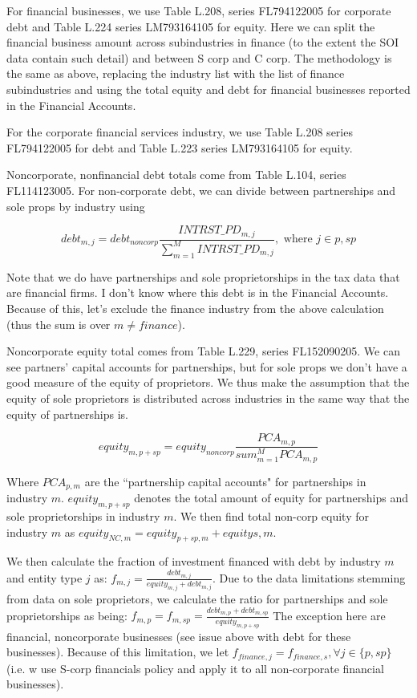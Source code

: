 \documentclass[article,11pt,letterpaper,fleqn]{article}
\theoremstyle{definition}
\numberwithin{equation}{section}
\begin{document}
For financial businesses, we use Table L.208, series FL794122005 for corporate debt and Table L.224 series LM793164105 for equity.  Here we can split the financial business amount across subindustries in finance (to the extent the SOI data contain such detail) and between S corp and C corp.  The methodology is the same as above, replacing the industry list with the list of finance subindustries and using the total equity and debt for financial businesses reported in the Financial Accounts.

For the corporate financial services industry, we use Table L.208 series FL794122005 for debt and Table L.223 series LM793164105 for equity.

Noncorporate, nonfinancial debt totals come from Table L.104, series FL114123005.  For non-corporate debt, we can divide between partnerships and sole props by industry using

\begin{equation}
debt_{m,j} = debt_{noncorp}\frac{INTRST\_PD_{m,j}}{\sum_{m=1}^{M}INTRST\_PD_{m,j}}, \text{ where } j\in{p,sp}
\end{equation}

Note that we do have partnerships and sole proprietorships in the tax data that are financial firms.  I don't know where this debt is in the Financial Accounts.  Because of this, let's exclude the finance industry from the above calculation (thus the sum is over $m\neq finance$). 

Noncorporate equity total comes from Table L.229, series FL152090205.  We can see partners' capital accounts for partnerships, but for sole props we don't have a good measure of the equity of proprietors.  We thus make the assumption that the equity of sole proprietors is distributed across industries in the same way that the equity of partnerships is.  

\begin{equation}
equity_{m,p+sp} = equity_{noncorp}\frac{PCA_{m,p}}{sum_{m=1}^{M}PCA_{m,p}}
\end{equation}

Where $PCA_{p,m}$ are the ``partnership capital accounts" for partnerships in industry $m$.  $equity_{m,p+sp}$ denotes the total amount of equity for partnerships and sole proprietorships in industry $m$.  We then find total non-corp equity for industry $m$ as $equity_{NC,m} = equity_{p+sp,m} + equity{s,m}$.  

We then calculate the fraction of investment financed with debt by industry $m$ and entity type $j$ as: $f_{m,j} = \frac{debt_{m,j}}{equity_{m,j}+debt_{m,j}}$.  Due to the data limitations stemming from data on sole proprietors, we calculate the ratio for partnerships and sole proprietorships as being: $f_{m,p} = f_{m,sp} = \frac{debt_{m,p}+debt_{m,sp}}{equity_{m,p+sp}}$  The exception here are financial, noncorporate businesses (see issue above with debt for these businesses).  Because of this limitation, we let $f_{finance,j}=f_{finance,s}, \forall j\in\{p,sp\}$ (i.e. w use S-corp financials policy and apply it to all non-corporate financial businesses).
\end{document}
